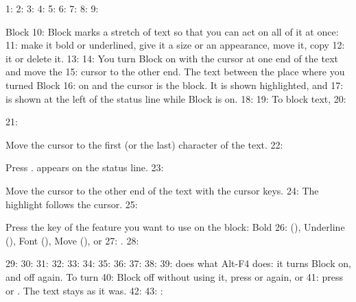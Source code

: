 1: %
2: %
3: %
4: %
5: %
6: %
7: %
8: 
9: \begin{Feature}{Block}
10: Block marks a stretch of text so that you can act on all of it at once:
11: make it bold or underlined, give it a size or an appearance, move it, copy
12: it or delete it.
13: 
14: You turn Block on with the cursor at one end of the text and move the
15: cursor to the other end.  The text between the place where you turned Block
16: on and the cursor is the block.  It is shown highlighted, and 
17: is shown at the left of the status line while Block is on.
18: 
19: To block text,
20: \begin{WPSteps}
21: \item Move the cursor to the first (or the last) character of the text.
22: \item Press .   appears on the status line.
23: \item Move the cursor to the other end of the text with the cursor keys.
24: The highlight follows the cursor.
25: \item Press the key of the feature you want to use on the block: Bold
26: (), Underline (), Font (), Move (), or
27: .
28: \end{WPSteps}
29: 
30: 
31: 
32: 
33: 
34: 
35: 
36: 
37: 
38: 
39:  does what Alt-F4 does: it turns Block on, and off again.  To turn
40: Block off without using it, press  or  again, or
41: press  or .  The text stays as it was.
42: 
43: : 

\end{Feature}

